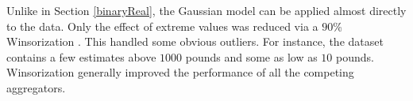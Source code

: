 \documentclass[11pt]{article}
\theoremstyle{definition}
\theoremstyle{definition}
\begin{document}

Unlike in Section  \ref{binaryReal}, the Gaussian model can be applied almost directly to the data. 
Only the effect of extreme values was reduced via a $90$\% Winsorization \citep{hastings1947low}. This handled some obvious outliers. For instance, the dataset contains a few estimates above $1000$ pounds and some as low as $10$ pounds.  Winsorization generally improved the performance of all the competing aggregators.




\end{document}
